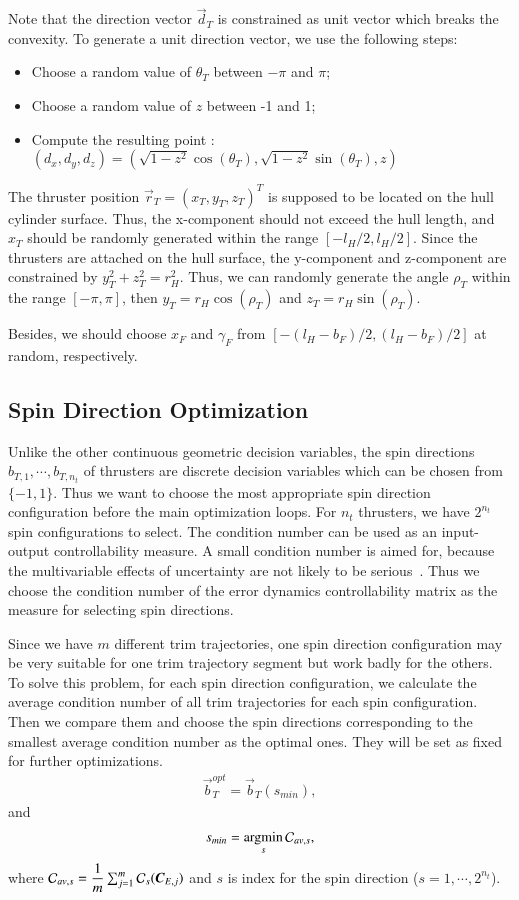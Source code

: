 Note that the direction vector $\vec{d}_{T}$ is constrained as unit vector which breaks the convexity. To generate a unit direction vector, we use the following steps:
\begin{itemize}
\item Choose a random value of $\theta_{T}$ between $-\pi$ and $\pi$;
\item Choose a random value of $z$ between -1 and 1;
\item Compute the resulting point : $(d_{x}, d_{y}, d_{z})=(\sqrt{1-z^{2}}\cos(\theta_{T}), \sqrt{1-z^{2}}\sin(\theta_{T}), z)$
\end{itemize}

The thruster position $\vec{r}_{T}=(x_{T}, y_{T}, z_{T})^{T}$ is supposed to be located on the hull cylinder surface. Thus, the x-component should not exceed the hull length, and $x_{T}$ should be randomly generated within the range $[-l_{H}/2,l_{H}/2]$. Since the thrusters are attached on the hull surface, the y-component and z-component are constrained by $y_{T}^{2}+z_{T}^{2}=r_{H}^{2}$. Thus, we can randomly generate the angle $\rho_{T}$ within the range $[-\pi,\pi]$, then $y_{T}=r_{H}\cos(\rho_{T})$ and $z_{T}=r_{H}\sin(\rho_{T})$.

Besides, we should choose $x_{F}$ and $\gamma_{F}$ from $[-(l_{H}-b_{F})/2,(l_{H}-b_{F})/2]$  at random, respectively. 
\subsection{Spin Direction Optimization}
Unlike the other continuous geometric decision variables, the spin directions $b_{T,1}, \cdots, b_{T,n_{t}}$ of thrusters are discrete decision variables which can be chosen from $\lbrace -1, 1 \rbrace$. Thus we want to choose the most appropriate spin direction configuration before the main optimization loops. For $n_{t}$ thrusters, we have $2^{n_{t}}$ spin configurations to select. The condition number can be used as an input-output controllability measure. A small condition number is aimed for, because the multivariable effects of uncertainty are not likely to be serious~\cite{Skogestad2005}. Thus we choose the condition number of the error dynamics controllability matrix as the measure for selecting spin directions. 

Since we have $m$ different trim trajectories, one spin direction configuration may be very suitable for one trim trajectory segment but work badly for the others. To solve this problem, for each spin direction configuration, we calculate the average condition number of all trim trajectories for each spin configuration. Then we compare them and choose the spin directions corresponding to the smallest average condition number as the optimal ones. They will be set as fixed for further optimizations. 
\begin{align}
\vec{b}_{T}^{opt}=\vec{b}_{T}(s_{min}),
\end{align}
and
\begin{align}
s_{min}=\displaystyle \operatorname*{\arg\!\min}_{s}\mathcal{C}_{av,s}, 
\end{align}
where $\mathcal{C}_{av,s}=\dfrac{1}{m}\sum_{j=1}^{m}\mathcal{C}_{s}(\emph{\textbf{C}}_{E,j})$ and $s$ is index for the spin direction ($s=1, \cdots, 2^{n_{t}}$).
